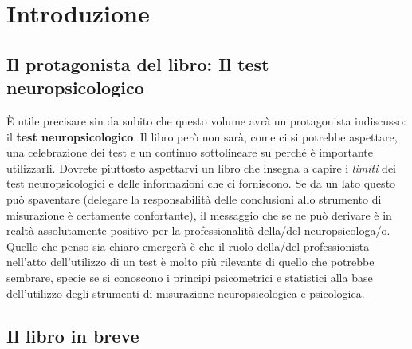 \documentclass[
  italian,
  letterpaper,
  paper=A4,
  headinclude=on,
  footinclude=on,
  12pt]{scrbook}
\begin{document}

\chapter*{Introduzione}\label{introduzione}


\section*{Il protagonista del libro: Il test
neuropsicologico}\label{il-protagonista-del-libro-il-test-neuropsicologico}


È utile precisare sin da subito che questo volume avrà un protagonista
indiscusso: il \textbf{test neuropsicologico}. Il libro però non sarà,
come ci si potrebbe aspettare, una celebrazione dei test e un continuo
sottolineare su perché è importante utilizzarli. Dovrete piuttosto
aspettarvi un libro che insegna a capire i \emph{limiti} dei test
neuropsicologici e delle informazioni che ci forniscono. Se da un lato
questo può spaventare (delegare la responsabilità delle conclusioni allo
strumento di misurazione è certamente confortante), il messaggio che se
ne può derivare è in realtà assolutamente positivo per la
professionalità della/del neuropsicologa/o. Quello che penso sia chiaro
emergerà è che il ruolo della/del professionista nell'atto dell'utilizzo
di un test è molto più rilevante di quello che potrebbe sembrare, specie
se si conoscono i principi psicometrici e statistici alla base
dell'utilizzo degli strumenti di misurazione neuropsicologica e
psicologica.

\section*{Il libro in breve}\label{il-libro-in-breve}

\end{document}
